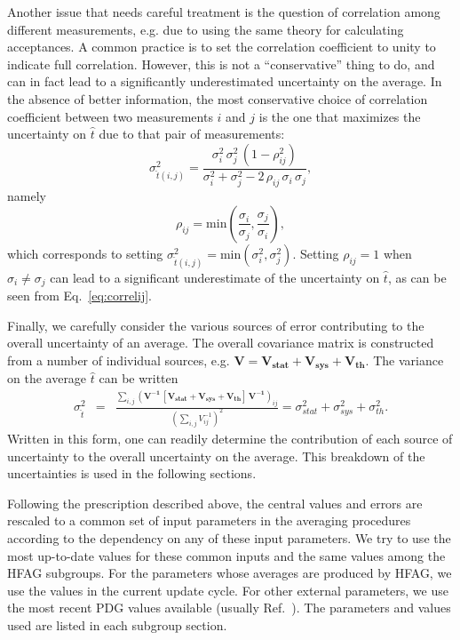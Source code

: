 
Another issue that needs careful treatment is the question of correlation
among different measurements, e.g. due to using the same theory for
calculating acceptances.  A common practice is to set the correlation
coefficient to unity to indicate full correlation.  However, this is
not a ``conservative'' thing to do, and can in fact lead to a significantly
underestimated uncertainty on the average.  In the absence of
better information, the most conservative choice of correlation coefficient
between two measurements $i$ and $j$
is the one that maximizes the uncertainty on $\hat{t}$
due to that pair of measurements:
\begin{equation}
\sigma_{\hat{t}(i,j)}^2 = \frac{\sigma_i^2\,\sigma_j^2\,(1-\rho_{ij}^2)}
   {\sigma_i^2 + \sigma_j^2 - 2\,\rho_{ij}\,\sigma_i\,\sigma_j} ,
\label{eq:correlij}
\end{equation}
namely
\begin{equation}
\rho_{ij} = \mathrm{min}\left(\frac{\sigma_i}{\sigma_j},\frac{\sigma_j}{\sigma_i}\right) ,
\label{eq:correlrho}
\end{equation}
which corresponds to setting $\sigma_{\hat{t}(i,j)}^2=\mathrm{min}(\sigma_i^2,\sigma_j^2)$.
Setting $\rho_{ij}=1$ when $\sigma_i\ne\sigma_j$ can lead to a significant
underestimate of the uncertainty on $\hat{t}$, as can be seen
from Eq.~\ref{eq:correlij}.

Finally, we carefully consider the various sources of error
contributing to the overall uncertainty of an average.
The overall covariance matrix is constructed from a number of
individual sources, e.g.
$\mathbf{V} = \mathbf{V_{stat}+V_{sys}+V_{th}}$.
The variance on the average $\hat{t}$ can be written
\begin{eqnarray}
\sigma^2_{\hat{t}} 
 &=& 
\frac{ \sum_{i,j}\left(\mathbf{V^{-1}}\, 
\mathbf{[V_{stat}+V_{sys}+V_{th}]}\, \mathbf{V^{-1}}\right)_{ij}}
{\left(\sum_{i,j} V^{-1}_{ij}\right)^2}
= \sigma^2_{stat} + \sigma^2_{sys} + \sigma^2_{th} .
\end{eqnarray}
Written in this form, one can readily determine the 
contribution of each source of uncertainty to the overall uncertainty
on the average.  This breakdown of the uncertainties is used 
in the following sections.

Following the prescription described above, the central values and
errors are rescaled to a common set of input parameters in the averaging
procedures according to the dependency on any of these input parameters.
We try to use the most up-to-date values for these common inputs and 
the same values among the HFAG subgroups. For the parameters whose
averages are produced by HFAG, we use the values in the current 
update cycle.  For other external parameters, we use the most
recent PDG values available (usually Ref.~\cite{PDG_2014}). 
The parameters and values used are listed in each subgroup section.
